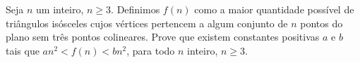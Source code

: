 Seja $n$ um  inteiro, $n \ge 3$. Definimos $f(n)$ como a maior quantidade possível  de  triângulos  isósceles  cujos  vértices  pertencem  a  algum conjunto  de  $n$  pontos  do  plano  sem  três  pontos  colineares.  Prove  que  existem  constantes  positivas  $a$  e  $b$ tais que $an^2 < f(n) < bn^2$, para todo $n$ inteiro, $n \ge 3$.